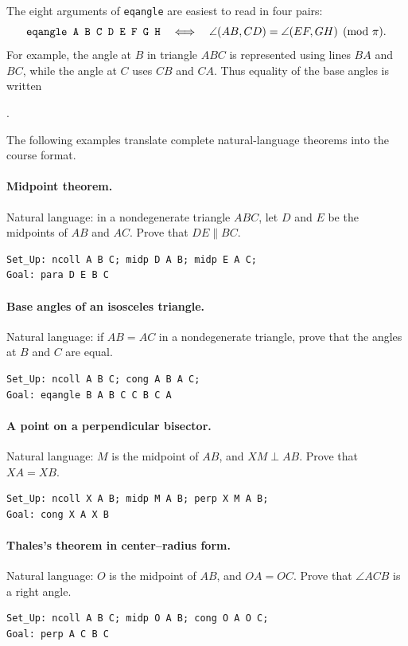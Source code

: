 \documentclass[reqno]{amsart}
\newcommand{\codeseg}[1]{%
    \begingroup
    \setlength{\fboxsep}{1.5pt}%
    \colorbox{agcodebg}{\texttt{\detokenize{#1}}}%
    \endgroup
}
\DeclareMathOperator{\1}{\textbf{1}}
\begin{document}
The eight arguments of \verb|eqangle| are easiest to read in four pairs:
\[
\verb|eqangle A B C D E F G H|
\quad\Longleftrightarrow\quad
\angle(AB,CD)=\angle(EF,GH)\pmod\pi.
\]
For example, the angle at $B$ in triangle $ABC$ is represented using lines
$BA$ and $BC$, while the angle at $C$ uses $CB$ and $CA$. Thus equality of
the base angles is written
\begin{center}
\codeseg{eqangle B A B C C B C A}.
\end{center}

The following examples translate complete natural-language theorems into the
course format.

\paragraph{Midpoint theorem.}
Natural language: in a nondegenerate triangle $ABC$, let $D$ and $E$ be the
midpoints of $AB$ and $AC$. Prove that $DE\parallel BC$.
\begin{lstlisting}
Set_Up: ncoll A B C; midp D A B; midp E A C;
Goal: para D E B C
\end{lstlisting}

\paragraph{Base angles of an isosceles triangle.}
Natural language: if $AB=AC$ in a nondegenerate triangle, prove that the
angles at $B$ and $C$ are equal.
\begin{lstlisting}
Set_Up: ncoll A B C; cong A B A C;
Goal: eqangle B A B C C B C A
\end{lstlisting}

\paragraph{A point on a perpendicular bisector.}
Natural language: $M$ is the midpoint of $AB$, and $XM\perp AB$. Prove that
$XA=XB$.
\begin{lstlisting}
Set_Up: ncoll X A B; midp M A B; perp X M A B;
Goal: cong X A X B
\end{lstlisting}

\paragraph{Thales's theorem in center--radius form.}
Natural language: $O$ is the midpoint of $AB$, and $OA=OC$. Prove that
$\angle ACB$ is a right angle.
\begin{lstlisting}
Set_Up: ncoll A B C; midp O A B; cong O A O C;
Goal: perp A C B C
\end{lstlisting}
\end{document}
